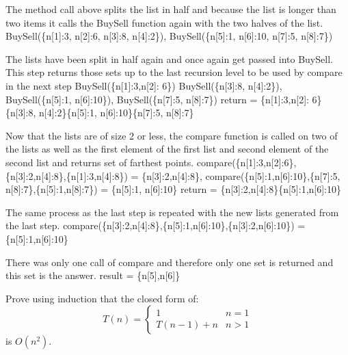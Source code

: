 \documentclass{article}
\begin{document}
The method call above splits the list in half and because the list is longer than two items it calls the BuySell function again with the two halves of the list.\newline
BuySell(\{n[1]:3, n[2]:6, n[3]:8, n[4]:2\}), BuySell(\{n[5]:1, n[6]:10, n[7]:5, n[8]:7\})\newline

The lists have been split in half again and once again get passed into BuySell. This step returns those sets up to the last recursion level to be used by compare in the next step\newline
BuySell(\{n[1]:3,n[2]: 6\}) BuySell(\{n[3]:8, n[4]:2\}), BuySell(\{n[5]:1, n[6]:10\}), BuySell(\{n[7]:5, n[8]:7\})\newline
return = \{n[1]:3,n[2]: 6\}\{n[3]:8, n[4]:2\}\{n[5]:1, n[6]:10\}\{n[7]:5, n[8]:7\}

Now that the lists are of size 2 or less, the compare function is called on two of the lists as well as the first element of the first list and second element of the second list and returns set of farthest points. \newline
compare(\{n[1]:3,n[2]:6\},\{n[3]:2,n[4]:8\},\{n[1]:3,n[4]:8\}) = \{n[3]:2,n[4]:8\}, compare(\{n[5]:1,n[6]:10\},\{n[7]:5, n[8]:7\},\{n[5]:1,n[8]:7\}) = \{n[5]:1, n[6]:10\}\newline
return = \{n[3]:2,n[4]:8\}\{n[5]:1,n[6]:10\}\newline

The same process as the last step is repeated with the new lists generated from the last step.\newline
compare(\{n[3]:2,n[4]:8\},\{n[5]:1,n[6]:10\},\{n[3]:2,n[6]:10\}) = \{n[5]:1,n[6]:10\}\newline

There was only one call of compare and therefore only one set is returned and this set is the answer.\newline
result = \{n[5],n[6]\}

\nextprob
Prove using induction that the closed form of:
$$T(n) = \begin{cases}
            1        & n=1\\
            T(n-1)+n & n>1
         \end{cases}
$$
is $O(n^2)$.
\end{document}
